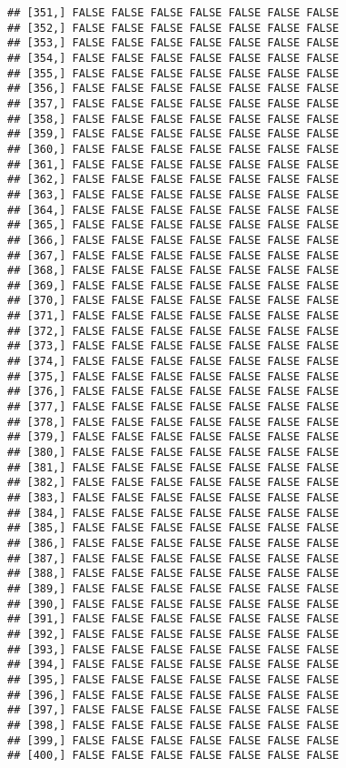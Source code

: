 \documentclass[
]{article}
\begin{document}
\begin{verbatim}
## [351,] FALSE FALSE FALSE FALSE FALSE FALSE FALSE
## [352,] FALSE FALSE FALSE FALSE FALSE FALSE FALSE
## [353,] FALSE FALSE FALSE FALSE FALSE FALSE FALSE
## [354,] FALSE FALSE FALSE FALSE FALSE FALSE FALSE
## [355,] FALSE FALSE FALSE FALSE FALSE FALSE FALSE
## [356,] FALSE FALSE FALSE FALSE FALSE FALSE FALSE
## [357,] FALSE FALSE FALSE FALSE FALSE FALSE FALSE
## [358,] FALSE FALSE FALSE FALSE FALSE FALSE FALSE
## [359,] FALSE FALSE FALSE FALSE FALSE FALSE FALSE
## [360,] FALSE FALSE FALSE FALSE FALSE FALSE FALSE
## [361,] FALSE FALSE FALSE FALSE FALSE FALSE FALSE
## [362,] FALSE FALSE FALSE FALSE FALSE FALSE FALSE
## [363,] FALSE FALSE FALSE FALSE FALSE FALSE FALSE
## [364,] FALSE FALSE FALSE FALSE FALSE FALSE FALSE
## [365,] FALSE FALSE FALSE FALSE FALSE FALSE FALSE
## [366,] FALSE FALSE FALSE FALSE FALSE FALSE FALSE
## [367,] FALSE FALSE FALSE FALSE FALSE FALSE FALSE
## [368,] FALSE FALSE FALSE FALSE FALSE FALSE FALSE
## [369,] FALSE FALSE FALSE FALSE FALSE FALSE FALSE
## [370,] FALSE FALSE FALSE FALSE FALSE FALSE FALSE
## [371,] FALSE FALSE FALSE FALSE FALSE FALSE FALSE
## [372,] FALSE FALSE FALSE FALSE FALSE FALSE FALSE
## [373,] FALSE FALSE FALSE FALSE FALSE FALSE FALSE
## [374,] FALSE FALSE FALSE FALSE FALSE FALSE FALSE
## [375,] FALSE FALSE FALSE FALSE FALSE FALSE FALSE
## [376,] FALSE FALSE FALSE FALSE FALSE FALSE FALSE
## [377,] FALSE FALSE FALSE FALSE FALSE FALSE FALSE
## [378,] FALSE FALSE FALSE FALSE FALSE FALSE FALSE
## [379,] FALSE FALSE FALSE FALSE FALSE FALSE FALSE
## [380,] FALSE FALSE FALSE FALSE FALSE FALSE FALSE
## [381,] FALSE FALSE FALSE FALSE FALSE FALSE FALSE
## [382,] FALSE FALSE FALSE FALSE FALSE FALSE FALSE
## [383,] FALSE FALSE FALSE FALSE FALSE FALSE FALSE
## [384,] FALSE FALSE FALSE FALSE FALSE FALSE FALSE
## [385,] FALSE FALSE FALSE FALSE FALSE FALSE FALSE
## [386,] FALSE FALSE FALSE FALSE FALSE FALSE FALSE
## [387,] FALSE FALSE FALSE FALSE FALSE FALSE FALSE
## [388,] FALSE FALSE FALSE FALSE FALSE FALSE FALSE
## [389,] FALSE FALSE FALSE FALSE FALSE FALSE FALSE
## [390,] FALSE FALSE FALSE FALSE FALSE FALSE FALSE
## [391,] FALSE FALSE FALSE FALSE FALSE FALSE FALSE
## [392,] FALSE FALSE FALSE FALSE FALSE FALSE FALSE
## [393,] FALSE FALSE FALSE FALSE FALSE FALSE FALSE
## [394,] FALSE FALSE FALSE FALSE FALSE FALSE FALSE
## [395,] FALSE FALSE FALSE FALSE FALSE FALSE FALSE
## [396,] FALSE FALSE FALSE FALSE FALSE FALSE FALSE
## [397,] FALSE FALSE FALSE FALSE FALSE FALSE FALSE
## [398,] FALSE FALSE FALSE FALSE FALSE FALSE FALSE
## [399,] FALSE FALSE FALSE FALSE FALSE FALSE FALSE
## [400,] FALSE FALSE FALSE FALSE FALSE FALSE FALSE

\end{verbatim}
\end{document}
